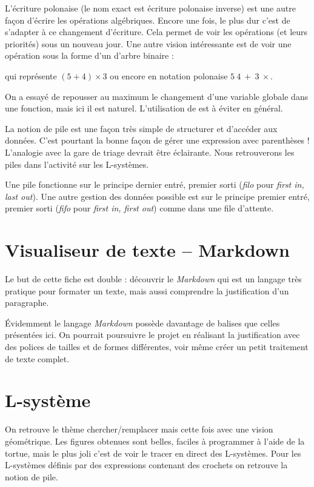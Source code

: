 \documentclass[11pt,class=report,crop=false]{standalone}
\begin{document}
L'écriture polonaise (le nom exact est \og{}écriture polonaise inverse\fg{}) est une autre façon d'écrire les opérations algébriques. Encore une fois, le plus dur c'est de s'adapter à ce changement d'écriture. Cela permet de voir les opérations (et leurs priorités) sous un nouveau jour. Une autre vision intéressante est de voir une opération sous la forme d'un d'arbre binaire :

qui représente $(5 + 4) \times 3$ ou encore en notation polonaise $5 \ 4 \ +\  3 \ \times$.

On a essayé de repousser au maximum le changement d'une variable globale dans une fonction, mais ici il est naturel. L'utilisation de  est à éviter en général.

La notion de pile est une façon très simple de structurer et d'accéder aux données.
C'est pourtant la bonne façon de gérer une expression avec parenthèses ! L'analogie avec la gare de triage devrait être éclairante. 
Nous retrouverons les piles dans l'activité sur les L-systèmes.


Une pile fonctionne sur le principe \og{}dernier entré, premier sorti\fg{} (\emph{filo} pour \emph{first in, last out}). Une autre gestion des données possible est sur le principe \og{}premier entré, premier sorti\og{} (\emph{fifo} pour \emph{first in, first out}) comme dans une file d'attente.

\section{Visualiseur de texte -- Markdown}

Le but de cette fiche est double : découvrir le \emph{Markdown} qui est un langage très pratique pour formater un texte, mais aussi comprendre la justification d'un paragraphe.

Évidemment le langage \emph{Markdown} possède davantage de balises que celles présentées ici. On pourrait poursuivre le projet en réalisant la justification avec des polices de tailles et de formes différentes, voir même créer un petit traitement de texte complet.


\section{L-système}

On retrouve le thème \og{}chercher/remplacer\fg{} mais cette fois avec une vision géométrique. Les figures obtenues sont belles, faciles à programmer à l'aide de la tortue, mais le plus joli c'est de voir le tracer en direct des L-systèmes.
Pour les L-systèmes définis par des expressions contenant des crochets on retrouve la notion de pile. 
\end{document}
